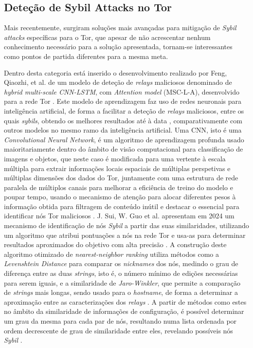 \subsection{Deteção de Sybil Attacks no Tor}
\label{ssec:deteccao_sybils_tor}

Mais recentemente, surgiram soluções mais avançadas para mitigação de \textit{Sybil attacks} específicas para o Tor, que apesar de não acrescentar nenhum conhecimento necessário para a solução apresentada, tornam-se interessantes como pontos de partida diferentes para a mesma meta.

Dentro desta categoria está inserido o desenvolvimento realizado por Feng, Qiaozhi, et al. de um modelo de deteção de \textit{relays} maliciosos denominado de \textit{hybrid multi-scale CNN-LSTM}, com \textit{Attention model} (MSC-L-A), desenvolvido para a rede Tor \cite{10217886}. Este modelo de aprendizagem faz uso de redes neuronais para inteligência artificial, de forma a facilitar a deteção de \textit{relays} maliciosos, entre os quais \textit{sybils}, obtendo os melhores resultados até à data \cite{10217886}, comparativamente com outros modelos no mesmo ramo da inteligência artificial. Uma CNN, isto é uma \textit{Convolutional Neural Network}, é um algoritmo de aprendizagem profunda usado maioritariamente dentro do âmbito de visão computacional para classificação de imagens e objetos, que neste caso é modificada para uma vertente à escala múltipla para extrair informações locais espaciais de múltiplas perspetivas e múltiplas dimensões dos dados do Tor, juntamente com uma estrutura de rede paralela de múltiplos canais para melhorar a eficiência de treino do modelo e poupar tempo, usando o mecanismo de atenção para alocar diferentes pesos à informação obtida para filtragem de conteúdo inútil e destacar o essencial para identificar nós Tor maliciosos \cite{10217886}. J. Sui, W. Guo et al. apresentam em 2024 um mecanismo de identificação de nós \textit{Sybil} a partir das suas similaridades, utilizando um algoritmo que atribui pontuações a nós na rede Tor e usa-as para determinar resultados aproximados do objetivo com alta precisão \cite{sui2024refining}. A construção deste algoritmo otimizado de \textit{nearest-neighbor ranking} utiliza métodos como a \textit{Levenshtein Distance} para comparar os \textit{nicknames} dos nós, medindo o grau de diferença entre as duas \textit{strings}, isto é, o número mínimo de edições necessárias para serem iguais, e a similaridade de \textit{Jaro-Winkler}, que permite a comparação de \textit{strings} mais longas, sendo usado para o \textit{hostname}, de forma a determinar a aproximação entre as caracterizações dos \textit{relays} \cite{sui2024refining}. A partir de métodos como estes no âmbito da similaridade de informações de configuração, é possível determinar um grau da mesma para cada par de nós, resultando numa lista ordenada por ordem decrescente de grau de similaridade entre eles, revelando possíveis nós \textit{Sybil} \cite{sui2024refining}.

